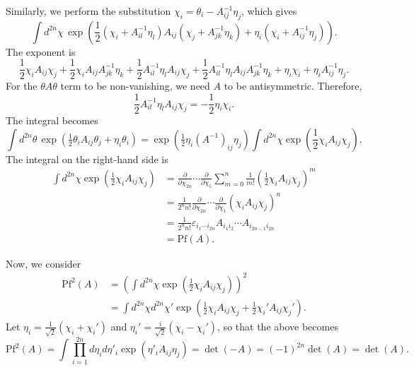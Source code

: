 \begin{solution}
    Similarly, we perform the substitution $\chi_i = \theta_i- A_{ij}^{-1}\eta_j$, which gives
    \begin{equation}
        \int d^{2n}\chi\,\exp\!\left(\frac{1}{2}(\chi_i +A_{il}^{-1}\eta_l)A_{ij}(\chi_j +A_{jk}^{-1}\eta_k) + \eta_i (\chi_i +A_{ij}^{-1}\eta_j)  \right).
    \end{equation}
    The exponent is 
    \begin{equation}
        \frac{1}{2}\chi_iA_{ij}\chi_j + \frac{1}{2}\chi_iA_{ij}A_{jk}^{-1}\eta_k + \frac{1}{2}A_{il}^{-1}\eta_lA_{ij}\chi_j + \frac{1}{2}A_{il}^{-1}\eta_l A_{ij}A_{jk}^{-1}\eta_k + \eta_i\chi_i + \eta_iA_{ij}^{-1}\eta_j.
    \end{equation}
    For the $\theta A\theta$ term to be non-vanishing, we need $A$ to be antisymmetric. Therefore,
    \begin{equation}
        \frac{1}{2}A_{il}^{-1}\eta_lA_{ij}\chi_j = -\frac{1}{2}\eta_i \chi_i.
    \end{equation}
    The integral becomes
    \begin{equation}
        \int d^{2n}\theta\,\exp\!\left(\tfrac{1}{2}\theta_i A_{ij}\theta_j + \eta_i\theta_i\right) = \exp\!\left(\tfrac{1}{2}\eta_i(A^{-1})_{ij}\eta_j\right)\int d^{2n}\chi \exp\left(\frac{1}{2}\chi_i A_{ij} \chi_j\right).
    \end{equation}
   The integral on the right-hand side is
   \begin{equation}
       \begin{aligned}
           \int d^{2n}\chi \exp\left(\frac{1}{2}\chi_i A_{ij} \chi_j\right) &= \frac{\partial}{\partial \chi_{2n}}\cdots \frac{\partial}{\partial \chi_1}\sum_{m=0}^n\frac{1}{m!}\left(\frac{1}{2}\chi_i A_{ij} \chi_j\right)^m\\
           &=\frac{1}{2^nn!}\frac{\partial}{\partial \chi_{2n}}\cdots \frac{\partial}{\partial \chi_1}\left(\chi_i A_{ij} \chi_j\right)^n\\
           &=\frac{1}{2^n n!}\varepsilon_{i_1\cdots i_{2n}}A_{i_1 i_2}\cdots A_{i_{2n-1}i_{2n}}\\
           &= \mathrm{Pf}(A).
       \end{aligned}
   \end{equation}

   Now, we consider
   \begin{equation}
   \begin{aligned}
          \mathrm{Pf}^2(A)&= \left(\int d^{2n}\chi \exp\left(\frac{1}{2}\chi_i A_{ij} \chi_j\right)\right)^2\\
          &=\int d^{2n}\chi d^{2n}\chi' \exp\left(\frac{1}{2}\chi_i A_{ij} \chi_j + \frac{1}{2}\chi_i' A_{ij} \chi_j'\right).
   \end{aligned}
   \end{equation}
   Let $\eta_i = \frac{1}{\sqrt{2}}(\chi_i + \chi_i')$ and $\eta_i' = \frac{i}{\sqrt{2}}(\chi_i - \chi_i')$, so that the above becomes
   \begin{equation}
       \mathrm{Pf}^2(A) = \int  \prod_{i=1}^{2n}d\eta_i d\eta'_i\exp\left(\eta'_i A_{ij}\eta_j\right) = \det (-A) = (-1)^{2n}\det (A) = \det(A).
   \end{equation}
   

\end{solution}
